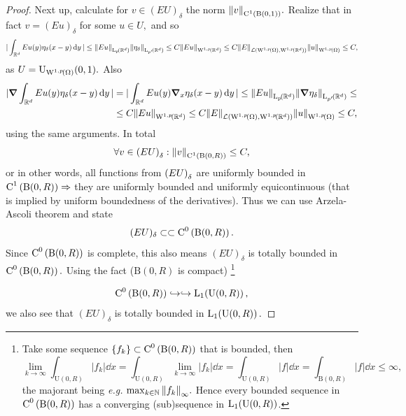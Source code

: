 \documentclass{article}
\begin{document}
\begin{proof}
	Next up, calculate for $v \in (EU)_{\delta}$ the norm $\norm{v}_{\text{C}^{1}\!\,\left(\text{B}(0,1) \right)}.$ Realize that in fact $v = (Eu)_{\delta}$ for some $u \in U,$ and so
	\[
		|\int_{\R^{d}}Eu(y) \eta_{\delta}(x-y)\dd{y}| \leq \norm{Eu}_{\LpSet{\R^{d}}}\norm{\eta_{\delta}}_{\LpSet[p']{\R^{d}}} \leq C \norm{Eu}_{\WkpSet[1][p]{\R^{d}}} \leq C \norm{E}_{\mathcal{L}\qty(\WkpSet[1][p]{\Omega}, \WkpSet[1][p]{\R^{d}})} \norm{u}_{\WkpSet[1][p]{\Omega}} \leq C,
	\]
	as $U = \text{U}_{\WkpSet[1][p]{\Omega}}(0,1).$ Also
	\begin{align*}
		|\grad \int_{\R^{d}}Eu(y) \eta_{\delta}(x-y)\dd{y}| &=|\int_{\R^{d}}Eu(y) \grad_x \eta_{\delta}(x-y)\dd{y}| \leq \norm{Eu}_{\LpSet{\R^{d}}} \norm{\grad \eta_{\delta}}_{\LpSet[p']{\R^{d}}} \leq \\
		&\leq C \norm{Eu}_{\WkpSet[1][p]{\R^{d}}} \leq C \norm{E}_{\mathcal{L}\qty(\WkpSet[1][p]{\Omega}, \WkpSet[1][p]{\R^{d}})} \norm{u}_{\WkpSet[1][p]{\Omega}} \leq C,
	\end{align*}
	using the same arguments. In total
	\[
		\forall v \in \qty(EU)_{\delta}: \norm{v}_{\text{C}^{1}\!\,\left(\text{B}(0,R) \right)}\leq C,
	\]
	or in other words, all functions from $\qty(EU)_{\delta}$ are uniformly bounded in $\text{C}^{1}\!\,\left(\text{B}(0,R) \right) \Rightarrow$ they are uniformly bounded and uniformly equicontinuous (that is implied by uniform boundedness of the derivatives). Thus we can use Arzela-Ascoli theorem and state
	\[
		(EU)_{\delta} \subset \subset \text{C}^{0}\!\,\left(\text{B}(0,R) \right).
	\]
	Since $\text{C}^{0}\!\,\left(\text{B}(0,R) \right)$ is complete, this also means $(EU)_{\delta}$ is totally bounded in $\text{C}^{0}\!\,\left(\text{B}(0,R) \right).$ Using the fact ($\text{B}(0,R)$ is compact) \footnote{Take some sequence $\qty{f_k} \subset \text{C}^{0}\!\,\left(\text{B}(0,R) \right)$ that is bounded, then
		\[
			\lim_{k \to \infty}\int_{\text{U}(0,R)}|f_k|\dd{x} = \int_{\text{U}(0,R)}\lim_{k \to \infty} |f_k|\dd{x} = \int_{\text{U}(0,R)}|f|\dd{x} = \int_{\text{B}(0,R)}|f|\dd{x} \leq \infty,
		\]
	the majorant being \textit{e.g.} $\max_{k \in {\mathbb N}}\norm{f_k}_{\infty}.$ Hence every bounded sequence in $\text{C}^{0}\!\,\left(\text{B}(0,R) \right)$ has a converging (sub)sequence in $\LpSet[1]{\text{U}(0,R)}$.}
	
	\[
		\CkSet{0}{\text{B}(0,R)} \hookrightarrow \hookrightarrow \LpSet[1]{\text{U}(0,R)},
	\]
	we also see that $(EU)_{\delta}$ is totally bounded in $\LpSet[1]{\text{U}(0,R)}.$


\end{proof}
\end{document}
